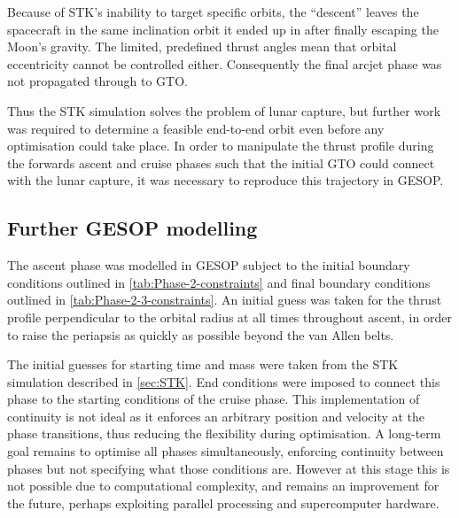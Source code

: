 Because of STK's inability to target specific orbits, the \enquote{descent} leaves the spacecraft in the same inclination orbit it ended up in after finally escaping the Moon's gravity. The limited, predefined thrust angles mean that orbital eccentricity cannot be controlled either. Consequently the final arcjet phase was not propagated through to GTO. 

Thus the STK simulation solves the problem of lunar capture, but further work was required to determine a feasible end-to-end orbit even before any optimisation could take place. In order to manipulate the thrust profile during the forwards ascent and cruise phases such that the initial GTO could connect with the lunar capture, it was necessary to reproduce this trajectory in GESOP. 

\subsection{Further GESOP modelling} \label{sub:GESOP2}

The ascent phase was modelled in GESOP subject to the initial boundary conditions outlined in \autoref{tab:Phase-2-constraints} and final boundary conditions outlined in \autoref{tab:Phase-2-3-constraints}. An initial guess was taken for the thrust profile perpendicular to the orbital radius at all times throughout ascent, in order to raise the periapsis as quickly as possible beyond the van Allen belts.

The initial guesses for starting time and mass were taken from the STK simulation described in \autoref{sec:STK}. End conditions were imposed to connect this phase to the starting conditions of the cruise phase. This implementation of continuity is not ideal as it enforces an arbitrary position and velocity at the phase transitions, thus reducing the flexibility during optimisation. A long-term goal remains to optimise all phases simultaneously, enforcing continuity between phases but not specifying what those conditions are. However at this stage this is not possible due to computational complexity, and remains an improvement for the future, perhaps exploiting parallel processing and supercomputer hardware.

